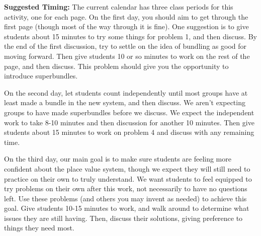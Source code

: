 \documentclass[nooutcomes,noauthor,handout]{ximera}
\begin{document}
\begin{instructorNotes}
{\bf Suggested Timing:} The current calendar has three class periods for this activity, one for each page. On the first day, you should aim to get through the first page (though most of the way through it is fine). One suggestion is to give students about 15 minutes to try some things for problem 1, and then discuss. By the end of the first discussion, try to settle on the idea of bundling as good for moving forward. Then give students 10 or so minutes to work on the rest of the page, and then discuss. This problem should give you the opportunity to introduce superbundles. 

On the second day, let students count independently until most groups have at least made a bundle in the new system, and then discuss. We aren't expecting groups to have made superbundles before we discuss. We expect the independent work to take 8-10 minutes and then discussion for another 10 minutes. Then give students about 15 minutes to work on problem 4 and discuss with any remaining time.

On the third day, our main goal is to make sure students are feeling more confident about the place value system, though we expect they will still need to practice on their own to truly understand. We want students to feel equipped to try problems on their own after this work, not necessarily to have no questions left. Use these problems (and others you may invent as needed) to achieve this goal. Give students 10-15 minutes to work, and walk around to determine what issues they are still having. Then, discuss their solutions, giving preference to things they need most. 


\end{instructorNotes}
\end{document}
